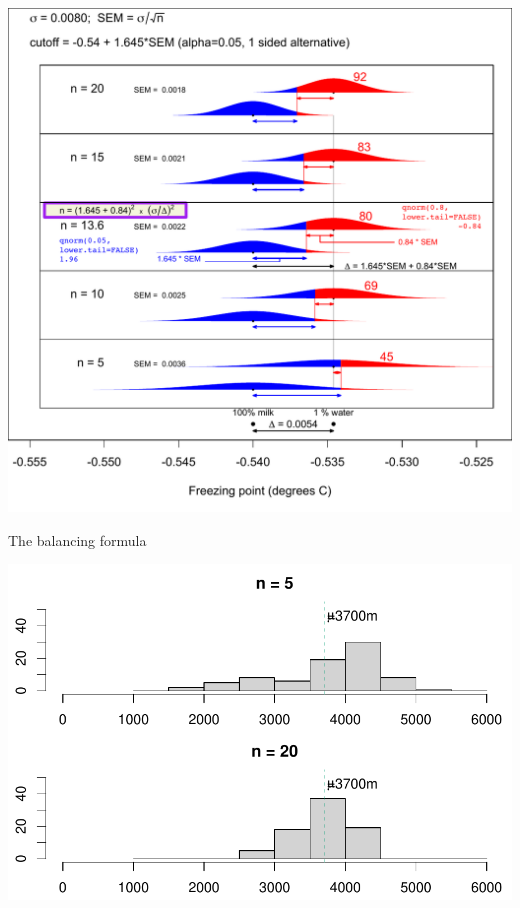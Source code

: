 \documentclass[10pt,handout]{beamer}\usepackage[]{graphicx}\usepackage[]{color}
\makeatletter
\def\maxwidth{ %
  \ifdim\Gin@nat@width>\linewidth
    \linewidth
  \else
    \Gin@nat@width
  \fi
}
\newenvironment{knitrout}{}{} %
\makeatother
\begin{document}
\begin{frame}
	\begin{center}
		\includegraphics[scale=0.5]{SampleSize1pctWaterAdded.pdf} 
	\end{center}
\end{frame}

\begin{frame}[fragile]{The balancing formula}
\begin{knitrout}\tiny
{}\color{fgcolor}

{\centering \includegraphics[width=\maxwidth]{figure/unnamed-chunk-20-1} 

}



\end{knitrout}
\end{frame}
\end{document}
